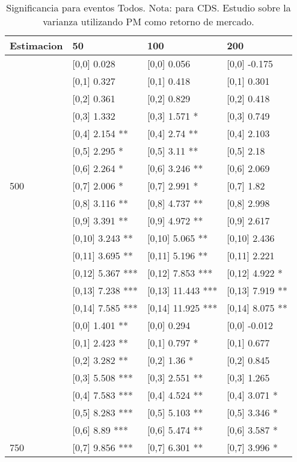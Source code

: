 \begin{table}

\caption{Significancia para eventos Todos. Nota: para CDS. Estudio sobre la varianza utilizando PM como retorno de mercado.}
\centering
\begin{tabular}[t]{llll}
\toprule
Estimacion & 50 & 100 & 200\\
\midrule
 & {}[0,0] 0.028 & {}[0,0] 0.056 & {}[0,0] -0.175\\
 & {}[0,1] 0.327 & {}[0,1] 0.418 & {}[0,1] 0.301\\
 & {}[0,2] 0.361 & {}[0,2] 0.829 & {}[0,2] 0.418\\
 & {}[0,3] 1.332 & {}[0,3] 1.571 * & {}[0,3] 0.749\\
 & {}[0,4] 2.154 ** & {}[0,4] 2.74 ** & {}[0,4] 2.103\\
\addlinespace
 & {}[0,5] 2.295 * & {}[0,5] 3.11 ** & {}[0,5] 2.18\\
 & {}[0,6] 2.264 * & {}[0,6] 3.246 ** & {}[0,6] 2.069\\
500 & {}[0,7] 2.006 * & {}[0,7] 2.991 * & {}[0,7] 1.82\\
 & {}[0,8] 3.116 ** & {}[0,8] 4.737 ** & {}[0,8] 2.998\\
 & {}[0,9] 3.391 ** & {}[0,9] 4.972 ** & {}[0,9] 2.617\\
\addlinespace
 & {}[0,10] 3.243 ** & {}[0,10] 5.065 ** & {}[0,10] 2.436\\
 & {}[0,11] 3.695 ** & {}[0,11] 5.196 ** & {}[0,11] 2.221\\
 & {}[0,12] 5.367 *** & {}[0,12] 7.853 *** & {}[0,12] 4.922 *\\
 & {}[0,13] 7.238 *** & {}[0,13] 11.443 *** & {}[0,13] 7.919 **\\
 & {}[0,14] 7.585 *** & {}[0,14] 11.925 *** & {}[0,14] 8.075 **\\
\addlinespace
 & {}[0,0] 1.401 ** & {}[0,0] 0.294 & {}[0,0] -0.012\\
 & {}[0,1] 2.423 ** & {}[0,1] 0.797 * & {}[0,1] 0.677\\
 & {}[0,2] 3.282 ** & {}[0,2] 1.36 * & {}[0,2] 0.845\\
 & {}[0,3] 5.508 *** & {}[0,3] 2.551 ** & {}[0,3] 1.265\\
 & {}[0,4] 7.583 *** & {}[0,4] 4.524 ** & {}[0,4] 3.071 *\\
\addlinespace
 & {}[0,5] 8.283 *** & {}[0,5] 5.103 ** & {}[0,5] 3.346 *\\
 & {}[0,6] 8.89 *** & {}[0,6] 5.474 ** & {}[0,6] 3.587 *\\
750 & {}[0,7] 9.856 *** & {}[0,7] 6.301 ** & {}[0,7] 3.996 *\\

\end{tabular}
\end{table}
